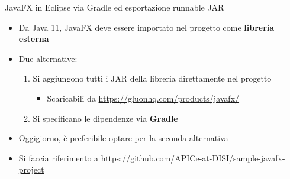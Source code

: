 \documentclass[xcolor=dvipsnames,presentation]{beamer}
\begin{document}

\begin{frame}{JavaFX in Eclipse via Gradle ed esportazione runnable JAR}
\begin{itemize}\itemsep10pt
\item Da Java 11, JavaFX deve essere importato nel progetto come \textbf{libreria esterna}
\item Due alternative:
\begin{enumerate}
\item Si aggiungono tutti i JAR della libreria direttamente nel progetto
\begin{itemize}
\item Scaricabili da \url{https://gluonhq.com/products/javafx/}
\end{itemize}
\item Si specificano le dipendenze via \textbf{Gradle}
\end{enumerate}
\item Oggigiorno, è preferibile optare per la seconda alternativa
\item Si faccia riferimento a 
\url{https://github.com/APICe-at-DISI/sample-javafx-project}
\end{itemize}
\end{frame}
\end{document}
